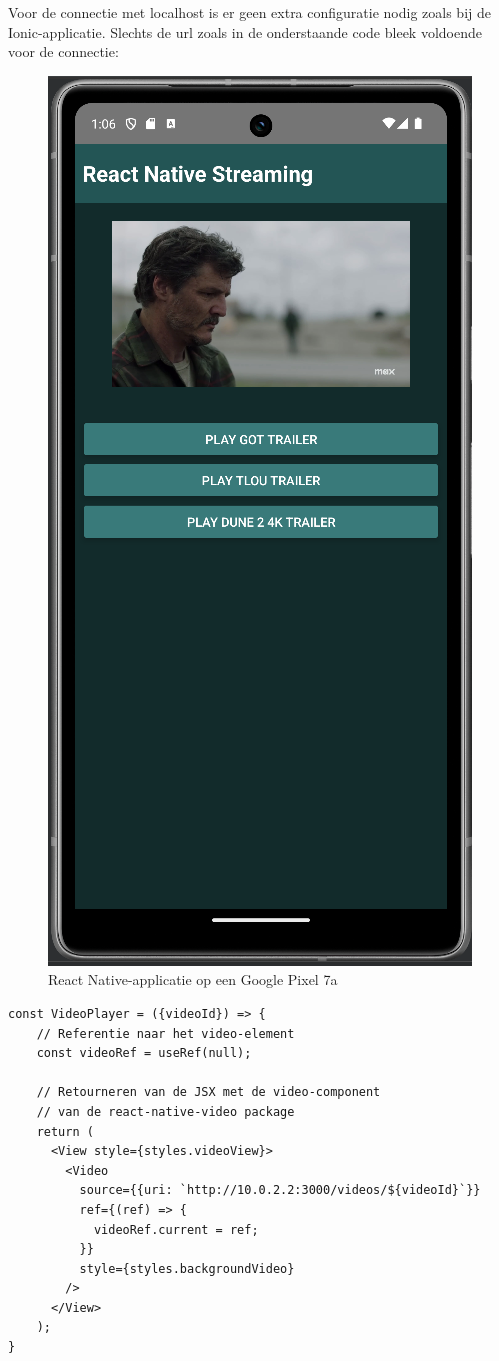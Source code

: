 Voor de connectie met localhost is er geen extra configuratie nodig zoals bij de Ionic-applicatie. Slechts de url zoals in de onderstaande code bleek voldoende voor de connectie:

\begin{figure}
  \centering
  \includegraphics[width=0.7\linewidth]{img/ReactNativePhone}
  \caption{React Native-applicatie op een Google Pixel 7a}
  \label{fig:React Native-applicatie op een Google Pixel 7a}
\end{figure}

\begin{mdframed}[backgroundcolor=bg]
  \begin{verbatim}
const VideoPlayer = ({videoId}) => {
    // Referentie naar het video-element
    const videoRef = useRef(null);

    // Retourneren van de JSX met de video-component
    // van de react-native-video package
    return (
      <View style={styles.videoView}>
        <Video 
          source={{uri: `http://10.0.2.2:3000/videos/${videoId}`}} 
          ref={(ref) => {
            videoRef.current = ref;
          }}         
          style={styles.backgroundVideo}
        />
      </View>
    );
}
  \end{verbatim}
\end{mdframed}

